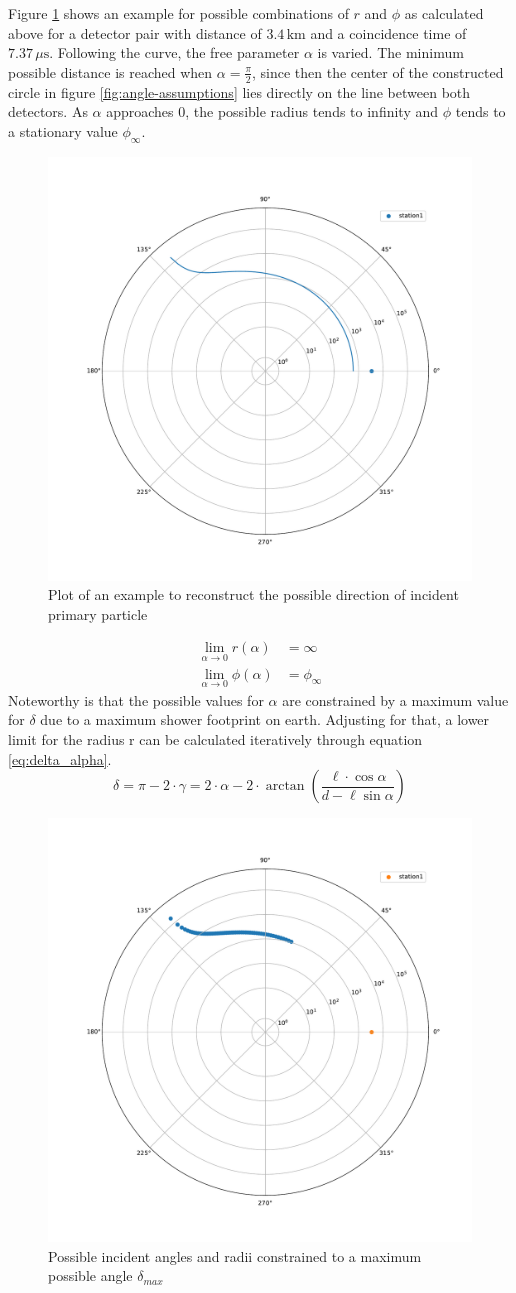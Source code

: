 \documentclass[abstract,toc,los,lof,english,10pt,glossary,acronyms]{jluthesis}
\begin{document}
Figure \ref{fig:reconstruction_example} shows an example for possible combinations of $r$ and $\phi$ as calculated above for a detector pair with distance of $3.4\,\text{km}$ and a coincidence time of $7.37\,\mu\text{s}$. Following the curve, the free parameter $\alpha$ is varied. The minimum possible distance is reached when $\alpha=\frac{\pi}{2}$, since then the center of the constructed circle in figure \ref{fig:angle-assumptions} lies directly on the line between both detectors. As $\alpha$ approaches $0$, the possible radius tends to infinity and $\phi$ tends to a stationary value $\phi_\infty$.
\begin{figure}[ht!]
	\centering
	\includegraphics[width=0.4\linewidth]{data/example_plot_vertical}
	\caption{Plot of an example to reconstruct the possible direction of incident primary particle}
	\label{fig:reconstruction_example}
\end{figure}
\begin{equation*}
	\begin{aligned}
		\lim_{\alpha\rightarrow0}r\left(\alpha\right) &= \infty\\
		\lim_{\alpha\rightarrow0}\phi\left(\alpha\right) &= \phi_\infty
	\end{aligned}
\end{equation*}
Noteworthy is that the possible values for $\alpha$ are constrained by a maximum value for $\delta$ due to a maximum shower footprint on earth. Adjusting for that, a lower limit for the radius r can be calculated iteratively through equation \ref{eq:delta_alpha}.
\begin{equation}\label{eq:delta_alpha}
	\delta = \pi - 2\cdot\gamma = 2\cdot\alpha - 2\cdot\arctan\left(\frac{\ell\cdot\cos\alpha}{d - \ell\sin\alpha}\right)
\end{equation}
\begin{figure}[ht!]
	\centering
	\includegraphics[width=0.4\linewidth]{data/example_plot_vertical_constrained}
	\caption{Possible incident angles and radii constrained to a maximum possible angle $\delta_{max}$}
	\label{fig:reconstruction_example_constrained}
\end{figure}
\end{document}
